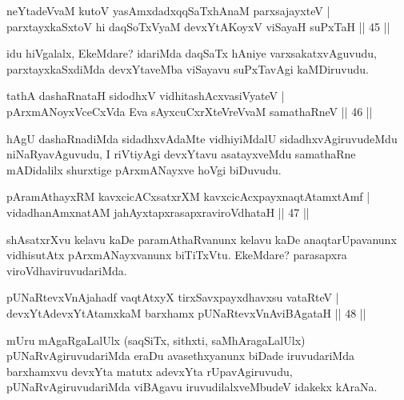 
\begin{shl}
neYtadeVvaM kutoV yasAmxdadxqqSaTxhAnaM parxsajayxteV  | \\
parxtayxkaSxtoV hi daqSoTxV\s yaM devxYtAKoyxV viSayaH suPxTaH \hfill||  45 ||  
\end{shl}

\begin{artha}
idu hiVgalalx, EkeMdare? idariMda daqSaTx hAniye varxsakatxvAguvudu, parxtayxkaSxdiMda devxYtaveMba viSayavu suPxTavAgi kaMDiruvudu.
\end{artha}

\begin{shl}
tathA dashaRnataH sidodhxV vidhitashAcxvasiVyateV  | \\
pArxmANoyxVceCxVda Eva sAyxcuCxrXteVreVvaM samathaRneV \hfill||  46 ||  
\end{shl}

\begin{artha}
hAgU dashaRnadiMda sidadhxvAdaMte vidhiyiMdalU sidadhxvAgiruvudeMdu niNaRyavAguvudu, I riVtiyAgi devxYtavu asatayxveMdu samathaRne mADidalilx shurxtige pArxmANayxve hoVgi biDuvudu.
\end{artha}


\begin{shl}
pAramAthayxRM kavxcicACxsatxrXM kavxcicAcxpayxnaqtAtamxtAmf  | \\
vidadhanAmxnatAM ja{\null}hAyxtapxrasapxraviroVdhataH \hfill||  47 ||  
\end{shl}

\begin{artha}
shAsatxrXvu kelavu kaDe paramAthaRvanunx kelavu kaDe anaqtarUpavanunx vidhisutAtx pArxmANayxvanunx biTiTxVtu. EkeMdare? parasapxra viroVdhaviruvudariMda.
\end{artha}

\begin{shl}
pUNaRtevxVnAja{\null}hadf vaqtAtxyX tirxSavxpayxdhavxsu vataRteV  | \\
devxYtAdevxYtAtamxkaM barxhamx pUNaRtevxVnAviBAgataH \hfill||  48 ||  
\end{shl}

\begin{artha}
mUru mAgaRgaLalUlx (saqSiTx, sithxti, saMhAragaLalUlx) pUNaRvAgiruvudariMda eraDu avasethxyanunx biDade iruvudariMda barxhamxvu devxYta matutx adevxYta rUpavAgiruvudu, pUNaRvAgiruvudariMda viBAgavu iruvudilalxveMbudeV idakekx kAraNa.
\end{artha}

